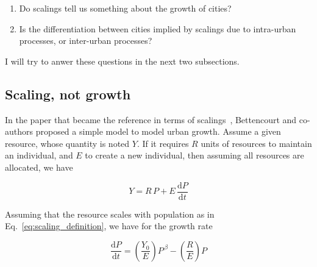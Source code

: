 \begin{enumerate}
    \item Do scalings tell us something about the growth of cities?
    \item Is the differentiation between cities implied by scalings due to
        intra-urban processes, or inter-urban processes?
\end{enumerate}

I will try to anwer these questions in the next two subsections.

\subsection{Scaling, not growth}
\label{sub:scaling_not_growth}

In the paper that became the reference in terms of
scalings~\cite{Bettencourt:2007}, Bettencourt and co-authors proposed a simple
model to model urban growth. Assume a given resource, whose quantity is noted
$Y$. If it requires $R$ units of resources to maintain an individual, and $E$ to
create a new individual, then assuming all resources are allocated, we have

\begin{equation}
    Y = R\,P + E\,\frac{\mathrm{d}P}{\mathrm{d}t}
    \label{eq:growth_resource_allocation}
\end{equation}

Assuming that the resource scales with population as in
Eq.~\ref{eq:scaling_definition}, we have for the growth rate

\begin{equation}
    \frac{\mathrm{d}P}{\mathrm{d}t} = \left(\frac{Y_0}{E}\right) P^{\,\beta} -
\left(\frac{R}{E}\right)P 
    \end{equation}

